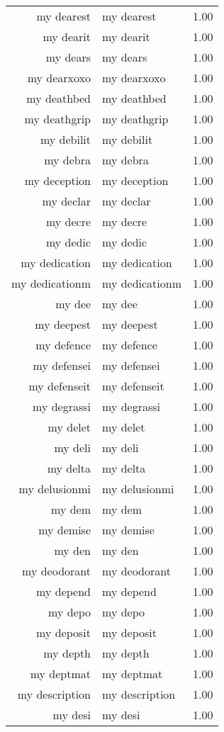 \begin{table}[ht]
\begin{tabular}{rlr}
  my dearest & my dearest & 1.00 \\ 
  my dearit & my dearit & 1.00 \\ 
  my dears & my dears & 1.00 \\ 
  my dearxoxo & my dearxoxo & 1.00 \\ 
  my deathbed & my deathbed & 1.00 \\ 
  my deathgrip & my deathgrip & 1.00 \\ 
  my debilit & my debilit & 1.00 \\ 
  my debra & my debra & 1.00 \\ 
  my deception & my deception & 1.00 \\ 
  my declar & my declar & 1.00 \\ 
  my decre & my decre & 1.00 \\ 
  my dedic & my dedic & 1.00 \\ 
  my dedication & my dedication & 1.00 \\ 
  my dedicationm & my dedicationm & 1.00 \\ 
  my dee & my dee & 1.00 \\ 
  my deepest & my deepest & 1.00 \\ 
  my defence & my defence & 1.00 \\ 
  my defensei & my defensei & 1.00 \\ 
  my defenseit & my defenseit & 1.00 \\ 
  my degrassi & my degrassi & 1.00 \\ 
  my delet & my delet & 1.00 \\ 
  my deli & my deli & 1.00 \\ 
  my delta & my delta & 1.00 \\ 
  my delusionmi & my delusionmi & 1.00 \\ 
  my dem & my dem & 1.00 \\ 
  my demise & my demise & 1.00 \\ 
  my den & my den & 1.00 \\ 
  my deodorant & my deodorant & 1.00 \\ 
  my depend & my depend & 1.00 \\ 
  my depo & my depo & 1.00 \\ 
  my deposit & my deposit & 1.00 \\ 
  my depth & my depth & 1.00 \\ 
  my deptmat & my deptmat & 1.00 \\ 
  my description & my description & 1.00 \\ 
  my desi & my desi & 1.00 \\ 

\end{tabular}
\end{table}

